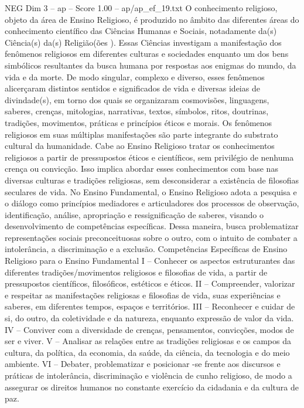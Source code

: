 \begin{textsample}{NEG Dim 3 – ap – Score 1.00 – ap/ap\_ef\_19.txt}
O conhecimento religioso, objeto da área de Ensino Religioso, é produzido no âmbito das diferentes áreas do conhecimento científico das Ciências Humanas e Sociais, notadamente da(s) Ciência(s) da(s) Religião(ões ).
Essas Ciências investigam a manifestação dos fenômenos religiosos em diferentes culturas e sociedades enquanto um dos bens simbólicos resultantes da busca humana por respostas aos enigmas do mundo, da vida e da morte.
De modo singular, complexo e diverso, esses fenômenos alicerçaram distintos sentidos e significados de vida e diversas ideias de divindade(s), em torno dos quais se organizaram cosmovisões, linguagens, saberes, crenças, mitologias, narrativas, textos, símbolos, ritos, doutrinas, tradições, movimentos, práticas e princípios éticos e morais.
Os fenômenos religiosos em suas múltiplas manifestações são parte integrante do substrato cultural da humanidade.
Cabe ao Ensino Religioso tratar os conhecimentos religiosos a partir de pressupostos éticos e científicos, sem privilégio de nenhuma crença ou convicção.
Isso implica abordar esses conhecimentos com base nas diversas culturas e tradições religiosas, sem desconsiderar a existência de filosofias seculares de vida.
No Ensino Fundamental, o Ensino Religioso adota a pesquisa e o diálogo como princípios mediadores e articuladores dos processos de observação, identificação, análise, apropriação e ressignificação de saberes, visando o desenvolvimento de competências específicas.
Dessa maneira, busca problematizar representações sociais preconceituosas sobre o outro, com o intuito de combater a intolerância, a discriminação e a exclusão.
Competências Específicas de Ensino Religioso para o Ensino Fundamental I – Conhecer os aspectos estruturantes das diferentes tradições/movimentos religiosos e filosofias de vida, a partir de pressupostos científicos, filosóficos, estéticos e éticos.
II – Compreender, valorizar e respeitar as manifestações religiosas e filosofias de vida, suas experiências e saberes, em diferentes tempos, espaços e territórios.
III – Reconhecer e cuidar de si, do outro, da coletividade e da natureza, enquanto expressão de valor da vida.
IV – Conviver com a diversidade de crenças, pensamentos, convicções, modos de ser e viver.
V – Analisar as relações entre as tradições religiosas e os campos da cultura, da política, da economia, da saúde, da ciência, da tecnologia e do meio ambiente.
VI – Debater, problematizar e posicionar -se frente aos discursos e práticas de intolerância, discriminação e violência de cunho religioso, de modo a assegurar os direitos humanos no constante exercício da cidadania e da cultura de paz.

\end{textsample}
